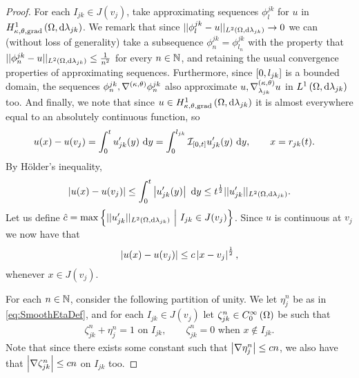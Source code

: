 \begin{proof}
	For each $I_{jk}\in J(v_j)$, take approximating sequences $\phi_l^{jk}$ for $u$ in $H^1_{\kappa,\theta,\mathrm{grad}}\left( \Omega, \mathrm{d}\lambda_{jk} \right)$.
	We remark that since $\lvert\lvert \phi_l^{jk}-u \rvert\rvert_{L^{2}\left( \Omega,\mathrm{d} \lambda_{jk} \right)}\rightarrow 0$ we can (without loss of generality) take a subsequence $\phi_n^{jk} = \phi_{l_n}^{jk}$ with the property that$\lvert\lvert \phi_n^{jk}-u \rvert\rvert_{L^{2}\left( \Omega,\mathrm{d} \lambda_{jk} \right)} \leq \frac{1}{n^2}$ for every $n\in\mathbb{N}$, and retaining the usual convergence properties of approximating sequences.
	Furthermore, since $\left[ 0,l_{jk} \right]$ is a bounded domain, the sequences $\phi_n^{jk}, \nabla^{\left( \kappa, \theta \right)}\phi_n^{jk}$ also approximate $u, \nabla^{\left( \kappa, \theta \right)}_{\lambda_{jk}}u$ in $L^1\left( \Omega,\mathrm{d}\lambda_{jk} \right)$ too.
	And finally, we note that since $u\in H^1_{\kappa,\theta,\mathrm{grad}}\left( \Omega, \mathrm{d}\lambda_{jk} \right)$ it is almost everywhere equal to an absolutely continuous function, so
	\begin{align*}
		u(x)-u(v_j) 
		&= \int_0^t u_{jk}'(y) \ \mathrm{d} y 
		= \int_0^{l_{jk}} \mathcal{I}_{\left[ 0,t \right]}u_{jk}'(y) \ \mathrm{d} y, 
		\qquad x=r_{jk}(t).
	\end{align*}
	By H\"{o}lder's inequality,
	\begin{align*}
		\left\lvert  u(x)-u(v_j)  \right\rvert 
		\leq \int_0^t \left\lvert u_{jk}'(y) \right\rvert \ \mathrm{d} y
		\leq t^{\frac{1}{2}} \lvert\lvert u_{jk}' \rvert\rvert_{L^{2}\left( \Omega,\mathrm{d} \lambda_{jk} \right)}.
	\end{align*}
	Let us define $\hat{c} = \max\left\{  \lvert\lvert u'_{jk} \rvert\rvert_{L^{2}\left( \Omega,\mathrm{d} \lambda_{jk} \right)} \ \middle\vert \  I_{jk} \in J(v_j) \right\}$.
	Since $u$ is continuous at $v_j$ we now have that
	\begin{align*}
		\left\lvert  u(x)-u(v_j)  \right\rvert \leq c\left\lvert x-v_j \right\rvert^{\frac{1}{2}},
	\end{align*}
	whenever $x\in J(v_j)$.
	
	For each $n\in\mathbb{N}$, consider the following partition of unity.
	We let $\eta_j^n$ be as in \eqref{eq:SmoothEtaDef}, and for each $I_{jk}\in J(v_j)$ let $\zeta_{jk}^n\in C^{\infty}_{0}\left( \Omega \right)$ be such that
	\begin{align*}
		\zeta_{jk}^n + \eta_j^n = 1 \text{ on } I_{jk}, 
		\qquad \zeta_{jk}^n = 0 \text{ when } x\not\in I_{jk}.
	\end{align*}
	Note that since there exists some constant such that $\left\lvert \nabla\eta_j^n \right\rvert\leq cn$, we also have that $\left\lvert \nabla\zeta_{jk}^n \right\rvert\leq cn$ on $I_{jk}$ too.
	

\end{proof}
